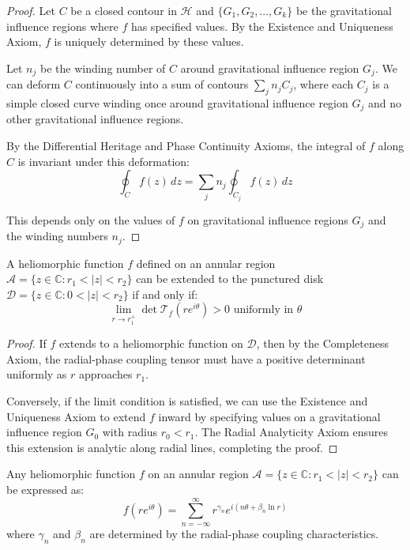 \begin{proof}
Let $C$ be a closed contour in $\mathcal{H}$ and $\{G_1, G_2, \ldots, G_k\}$ be the gravitational influence regions where $f$ has specified values. By the Existence and Uniqueness Axiom, $f$ is uniquely determined by these values.

Let $n_j$ be the winding number of $C$ around gravitational influence region $G_j$. We can deform $C$ continuously into a sum of contours $\sum_j n_j C_j$, where each $C_j$ is a simple closed curve winding once around gravitational influence region $G_j$ and no other gravitational influence regions.

By the Differential Heritage and Phase Continuity Axioms, the integral of $f$ along $C$ is invariant under this deformation:
\begin{equation}
\oint_C f(z) \, dz = \sum_j n_j \oint_{C_j} f(z) \, dz
\end{equation}

This depends only on the values of $f$ on gravitational influence regions $G_j$ and the winding numbers $n_j$.
\end{proof}

\begin{theorem}
A heliomorphic function $f$ defined on an annular region $\mathcal{A} = \{z \in \mathbb{C} : r_1 < |z| < r_2\}$ can be extended to the punctured disk $\mathcal{D} = \{z \in \mathbb{C} : 0 < |z| < r_2\}$ if and only if:
\begin{equation}
\lim_{r \to r_1^+} \det\mathcal{T}_f(re^{i\theta}) > 0 \text{ uniformly in } \theta
\end{equation}
\end{theorem}

\begin{proof}
If $f$ extends to a heliomorphic function on $\mathcal{D}$, then by the Completeness Axiom, the radial-phase coupling tensor must have a positive determinant uniformly as $r$ approaches $r_1$.

Conversely, if the limit condition is satisfied, we can use the Existence and Uniqueness Axiom to extend $f$ inward by specifying values on a gravitational influence region $G_0$ with radius $r_0 < r_1$. The Radial Analyticity Axiom ensures this extension is analytic along radial lines, completing the proof.
\end{proof}

\begin{theorem}
Any heliomorphic function $f$ on an annular region $\mathcal{A} = \{z \in \mathbb{C} : r_1 < |z| < r_2\}$ can be expressed as:
\begin{equation}
f(re^{i\theta}) = \sum_{n=-\infty}^{\infty} r^{\gamma_n} e^{i(n\theta + \beta_n \ln r)}
\end{equation}
where $\gamma_n$ and $\beta_n$ are determined by the radial-phase coupling characteristics.
\end{theorem}

